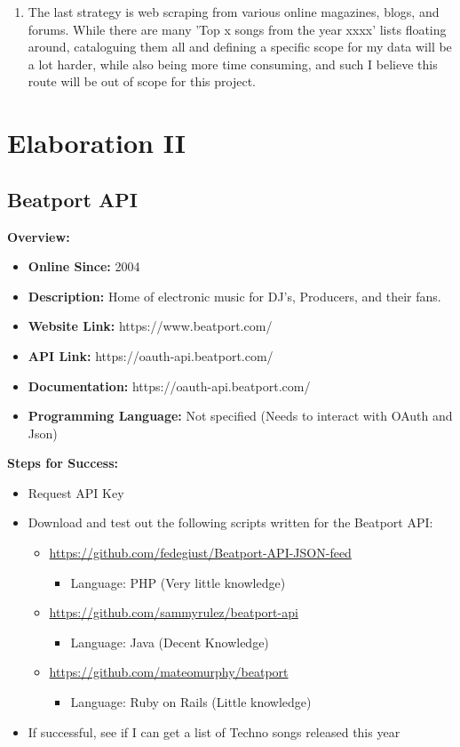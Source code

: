 \documentclass{article}
\begin{document}
\begin{enumerate}
\begin{enumerate}
    \end{enumerate}
    \item The last strategy is web scraping from various online magazines, blogs, and forums. While there are many 'Top x songs from the year xxxx' lists floating around, cataloguing them all and defining a specific scope for my data will be a lot harder, while also being more time consuming, and such I believe this route will be out of scope for this project.
\end{enumerate}
\newpage
\section{Elaboration II}
\subsection{Beatport API}
\textbf{Overview:}
\begin{itemize}
    \item \textbf{Online Since:} 2004
    \item \textbf{Description:} Home of electronic music for DJ's, Producers, and their fans.
    \item \textbf{Website Link:} https://www.beatport.com/
    \item \textbf{API Link:} https://oauth-api.beatport.com/
    \item \textbf{Documentation:} https://oauth-api.beatport.com/
    \item \textbf{Programming Language:} Not specified (Needs to interact with OAuth and Json)
\end{itemize}
\textbf{Steps for Success:}
\begin{itemize}
    \item Request API Key
    \item Download and test out the following scripts written for the Beatport API:
    \begin{itemize}
        \item \url{https://github.com/fedegiust/Beatport-API-JSON-feed}
        \begin{itemize}
            \item Language: PHP (Very little knowledge)
        \end{itemize}
        \item \url{https://github.com/sammyrulez/beatport-api}
        \begin{itemize}
            \item Language: Java (Decent Knowledge)
        \end{itemize}
        \item \url{https://github.com/mateomurphy/beatport}
        \begin{itemize}
            \item Language: Ruby on Rails (Little knowledge)
        \end{itemize}
    \end{itemize}
    \item If successful, see if I can get a list of Techno songs released this year
\end{itemize}
\end{document}
